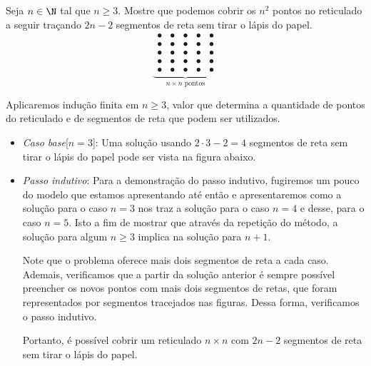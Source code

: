 \begin{example}
Seja $n \in \N$ tal que $n\ge 3$. Mostre  que podemos cobrir os $n^2$ pontos no reticulado a seguir traçando $2n-2$ segmentos de reta sem tirar o lápis do papel.
%
\begin{equation*}
\underbrace{\begin{array}{ccccc}
                \bullet & \bullet & \bullet & \bullet & \bullet \\
                \bullet & \bullet & \bullet & \bullet & \bullet \\
                \bullet & \bullet & \bullet & \bullet & \bullet \\
                \bullet & \bullet & \bullet & \bullet & \bullet \\
                \bullet & \bullet & \bullet & \bullet & \bullet
              \end{array}
}_{n \times n \text{ pontos}}
\end{equation*}
\begin{solution}
	Aplicaremos indução finita em $n \ge 3$, valor que determina a quantidade de pontos do reticulado e de segmentos de reta que podem ser utilizados.
	\begin{itemize}
		\item \textit{Caso base}[$n = 3$]: Uma solução usando $2\cdot 3 -2 = 4$ segmentos de reta sem tirar o lápis do papel pode ser vista na figura abaixo.

		\begin{center}
		
		\end{center}
		
		\item \textit{Passo indutivo}: Para a demonstração do passo indutivo, fugiremos um pouco do modelo que estamos apresentando até então e apresentaremos como a solução para o caso $n = 3$ nos traz a solução para o caso $n = 4$ e desse, para o caso $n=5$. Isto a fim de mostrar que através da repetição do método, a solução para algum $n \ge 3$ implica na solução para $n+1$.
		
		\begin{center}
		
		\end{center}
		
		Note que o problema oferece mais dois segmentos de reta a cada caso. Ademais, verificamos que a partir da solução anterior é sempre possível preencher os novos pontos com mais dois segmentos de retas, que foram representados por segmentos tracejados nas figuras. Dessa forma, verificamos o passo indutivo.

		Portanto, é possível cobrir um reticulado $n \times n$ com $2n-2$ segmentos de reta sem tirar o lápis do papel.
	\end{itemize}
\end{solution}
\end{example}

